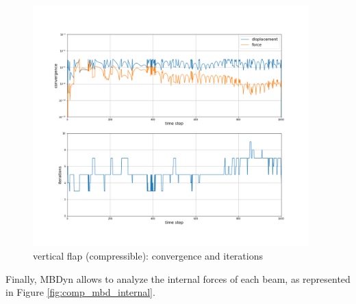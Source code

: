 \begin{figure}[htbp!]
	\centering
	\includegraphics[width=0.95\textwidth, trim=0 80 0 100, clip]{images/comp_flap/MBD_iterations_comp.png}
	\caption{vertical flap (compressible): convergence and iterations}
	\label{fig:comp_mbd_iter}
\end{figure}


Finally, MBDyn allows to analyze the internal forces of each beam, as represented in Figure \ref{fig:comp_mbd_internal}.

